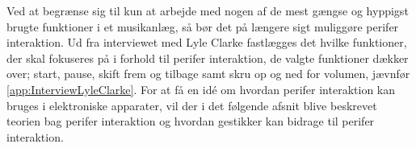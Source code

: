 Ved at begrænse sig til kun at arbejde med nogen af de mest gængse og hyppigst brugte funktioner i et musikanlæg, så bør det på længere sigt muliggøre perifer interaktion. Ud fra interviewet med Lyle Clarke fastlægges det hvilke funktioner, der skal fokuseres på i forhold til perifer interaktion, de valgte funktioner dækker over; start, pause, skift frem og tilbage samt skru op og ned for volumen, jævnfør \autoref{app:InterviewLyleClarke}.\blankline
%
For at få en idé om hvordan perifer interaktion kan bruges i elektroniske apparater, vil der i det følgende afsnit blive beskrevet teorien bag perifer interaktion og hvordan gestikker kan bidrage til perifer interaktion. 

